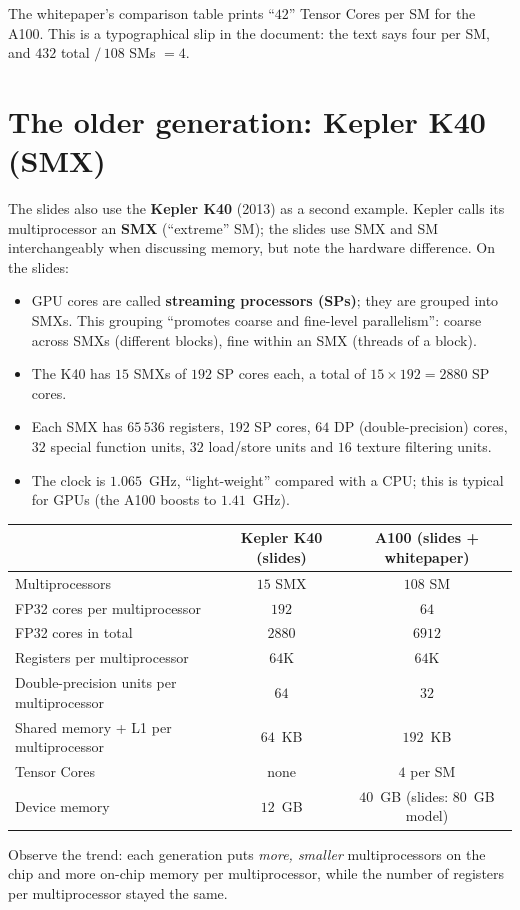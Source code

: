 \begin{pitfall}
The whitepaper's comparison table prints ``$42$'' Tensor Cores per SM for the A100. This is a typographical slip in the document: the text says four per SM, and $432$ total $/\,108$ SMs $=4$.
\end{pitfall}

\section{The older generation: Kepler K40 (SMX)}


The slides also use the \textbf{Kepler K40} (2013) as a second example. Kepler calls its multiprocessor an \textbf{SMX} (``extreme'' SM); the slides use SMX and SM
interchangeably when discussing memory, but note the hardware difference. On the slides:
\begin{itemize}
  \item GPU cores are called \textbf{streaming processors (SPs)}; they are grouped into SMXs. This grouping ``promotes coarse and fine-level parallelism'': coarse across SMXs (different blocks), fine within an SMX (threads of a block).
  \item The K40 has $15$ SMXs of $192$ SP cores each, a total of $15\times192=2880$ SP cores.
  \item Each SMX has $65\,536$ registers, $192$ SP cores, $64$ DP (double-precision) cores, $32$ special function units, $32$ load/store units and $16$ texture filtering units.
  \item The clock is $1.065$~GHz, ``light-weight'' compared with a CPU; this is typical for GPUs (the A100 boosts to $1.41$~GHz).
\end{itemize}

\begin{center}\small
\begin{tabular}{@{}lcc@{}}
\toprule
 & \textbf{Kepler K40 (slides)} & \textbf{A100 (slides + whitepaper)}\\
\midrule
Multiprocessors & $15$ SMX & $108$ SM\\
FP32 cores per multiprocessor & $192$ & $64$\\
FP32 cores in total & $2880$ & $6912$\\
Registers per multiprocessor & $64$K & $64$K\\
Double-precision units per multiprocessor & $64$ & $32$\\
Shared memory + L1 per multiprocessor & $64$~KB & $192$~KB\\
Tensor Cores & none & $4$ per SM\\
Device memory & $12$~GB & $40$~GB (slides: $80$~GB model)\\
\bottomrule
\end{tabular}
\end{center}
Observe the trend: each generation puts \emph{more, smaller} multiprocessors on the chip and more on-chip memory per multiprocessor,
while the number of registers per multiprocessor stayed the same.


